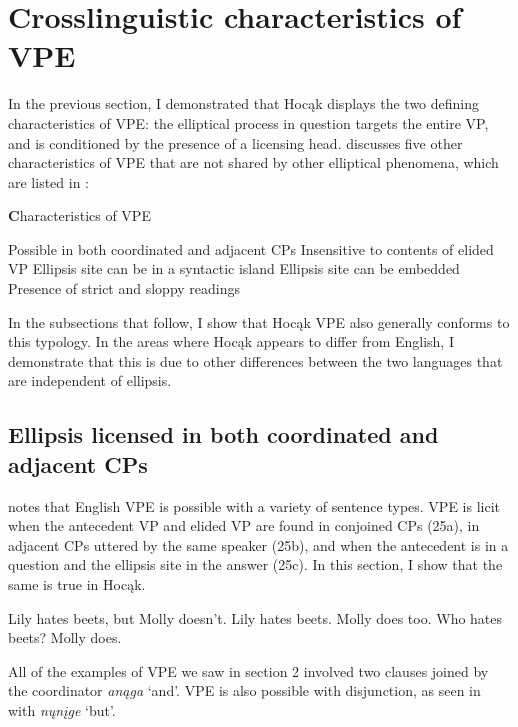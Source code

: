 \documentclass[output=paper]{LSP/langsci}
\begin{document}
\section{Crosslinguistic characteristics of VPE}

In the previous section, I demonstrated that Hocąk displays the two defining characteristics of VPE: the elliptical process in question targets the entire VP, and is conditioned by the presence of a licensing head. \citet{Goldberg2005} discusses five other characteristics of VPE that are not shared by other elliptical phenomena, which are listed in : 

\begin{exe}
\ex
{\textbf Characteristics of VPE}
\begin{xlist}
\ex
Possible in both coordinated and adjacent CPs
\ex
Insensitive to contents of elided VP
\ex
Ellipsis site can be in a syntactic island
\ex
Ellipsis site can be embedded
\ex
Presence of strict and sloppy readings
\end{xlist}
\end{exe}


In the subsections that follow, I show that Hocąk VPE also generally conforms to this typology. In the areas where Hocąk appears to differ from English, I demonstrate that this is due to other differences between the two languages that are independent of ellipsis.

\subsection{Ellipsis licensed in both coordinated and adjacent CPs}

\citet{Goldberg2005} notes that English VPE is possible with a variety of sentence types. VPE is licit when the antecedent VP and elided VP are found in conjoined CPs (25a), in adjacent CPs uttered by the same speaker (25b), and when the antecedent is in a question and the ellipsis site in the answer (25c). In this section, I show that the same is true in Hocąk.

\begin{exe}
\ex
\begin{xlist}
\ex
Lily hates beets, but Molly doesn't.
\ex
Lily hates beets. Molly does too.
\ex
Who hates beets? Molly does.
\end{xlist}
\end{exe}

All of the examples of VPE we saw in section 2 involved two clauses joined by the coordinator \emph{anąga} `and'. VPE is also possible with disjunction, as seen in  with \emph{nųnįge} `but'.
\end{document}
